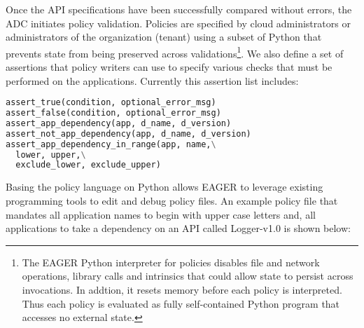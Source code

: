 Once the API specifications have been successfully compared without errors,
the ADC initiates policy validation. Policies are specified by cloud
administrators or administrators of the organization (tenant) 
using a subset of Python that prevents state from being preserved across
validations\footnote{The EAGER Python interpreter for policies disables file
and network operations, library calls and intrinsics that could allow
state to persist across invocations.  In addtion, it resets memory before each
policy is interpreted.  Thus each policy is evaluated as fully self-contained
Python program that accesses no external state.}.
We also define a set of assertions
that policy writers can use to specify various checks that must be performed
on the applications. 
Currently this assertion list includes:
{\footnotesize 
\begin{lstlisting}[language=Python, frame=single]
assert_true(condition, optional_error_msg)
assert_false(condition, optional_error_msg)
assert_app_dependency(app, d_name, d_version)
assert_not_app_dependency(app, d_name, d_version)
assert_app_dependency_in_range(app, name,\
  lower, upper,\
  exclude_lower, exclude_upper)
\end{lstlisting}
}


Basing the policy language on Python allows EAGER to leverage
existing programming tools to edit and debug policy files. An example policy
file that mandates all application names to begin with upper case letters and,
all applications to take a dependency on an API called Logger-v1.0 is shown
below:

